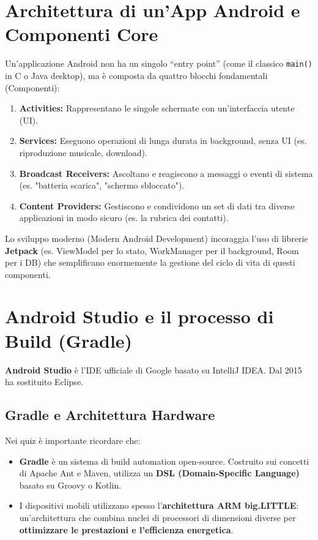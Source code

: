 \section{Architettura di un'App Android e Componenti Core}
Un'applicazione Android non ha un singolo ``entry point'' (come il classico \texttt{main()} in C o Java desktop), ma è composta da quattro blocchi fondamentali (Componenti):
\begin{enumerate}
    \item \textbf{Activities:} Rappresentano le singole schermate con un'interfaccia utente (UI).
    \item \textbf{Services:} Eseguono operazioni di lunga durata in background, senza UI (es.
    riproduzione musicale, download).
    \item \textbf{Broadcast Receivers:} Ascoltano e reagiscono a messaggi o eventi di sistema (es.
    "batteria scarica", "schermo sbloccato").
    \item \textbf{Content Providers:} Gestiscono e condividono un set di dati tra diverse applicazioni in modo sicuro (es.
    la rubrica dei contatti).
\end{enumerate}

Lo sviluppo moderno (Modern Android Development) incoraggia l'uso di librerie \textbf{Jetpack} (es. ViewModel per lo stato, WorkManager per il background, Room per i DB) che semplificano enormemente la gestione del ciclo di vita di questi componenti.

\section{Android Studio e il processo di Build (Gradle)}
\textbf{Android Studio} è l'IDE ufficiale di Google basato su IntelliJ IDEA. Dal 2015 ha sostituito Eclipse.

\subsection{Gradle e Architettura Hardware}
Nei quiz è importante ricordare che:
\begin{itemize}
    \item \textbf{Gradle} è un sistema di build automation open-source.
    Costruito sui concetti di Apache Ant e Maven, utilizza un \textbf{DSL (Domain-Specific Language)} basato su Groovy o Kotlin.
    \item I dispositivi mobili utilizzano spesso l'\textbf{architettura ARM big.LITTLE}: un'architettura che combina
    nuclei di processori di dimensioni diverse per \textbf{ottimizzare le prestazioni e l'efficienza energetica}.
\end{itemize}

